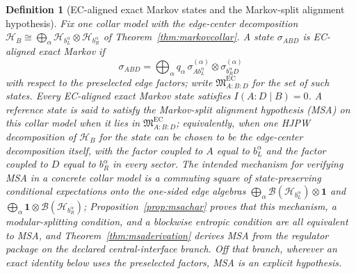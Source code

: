 \documentclass[11pt]{article}
\newtheorem{definition}[theorem]{Definition}
\begin{document}
\begin{definition}[EC-aligned exact Markov states and the Markov-split alignment hypothesis]\label{def:ecaligned}
Fix one collar model with the edge-center decomposition
\(\mathcal H_B\cong\bigoplus_\alpha \mathcal H_{b_L^\alpha}\otimes \mathcal H_{b_R^\alpha}\)
of Theorem~\ref{thm:markovcollar}. A state \(\sigma_{ABD}\) is \emph{EC-aligned exact Markov} if
\[
\sigma_{ABD}
=
\bigoplus_\alpha q_\alpha\,
\sigma^{(\alpha)}_{A b_L^\alpha}\otimes \sigma^{(\alpha)}_{b_R^\alpha D}
\]
with respect to the preselected edge factors; write \(\mathfrak M^{\mathrm{EC}}_{A:B:D}\) for the set of such states. Every EC-aligned exact Markov state satisfies \(I(A:D\mid B)=0\). A reference state is said to satisfy the \emph{Markov-split alignment hypothesis} (MSA) on this collar model when it lies in \(\mathfrak M^{\mathrm{EC}}_{A:B:D}\); equivalently, when one HJPW decomposition of \(\mathcal H_B\) for the state can be chosen to be the edge-center decomposition itself, with the factor coupled to \(A\) equal to \(b_L^\alpha\) and the factor coupled to \(D\) equal to \(b_R^\alpha\) in every sector. The intended mechanism for verifying MSA in a concrete collar model is a commuting square of state-preserving conditional expectations onto the one-sided edge algebras \(\bigoplus_\alpha \mathcal B(\mathcal H_{b_L^\alpha})\otimes\mathbf 1\) and \(\bigoplus_\alpha \mathbf 1\otimes\mathcal B(\mathcal H_{b_R^\alpha})\); Proposition~\ref{prop:msachar} proves that this mechanism, a modular-splitting condition, and a blockwise entropic condition are all equivalent to MSA, and Theorem~\ref{thm:msaderivation} derives MSA from the regulator package on the declared central-interface branch. Off that branch, wherever an exact identity below uses the preselected factors, MSA is an explicit hypothesis.
\end{definition}
\end{document}
